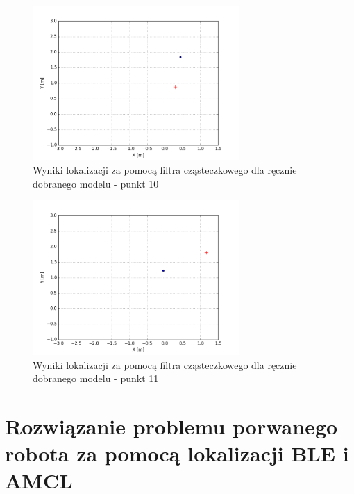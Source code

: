 \begin{figure}[H]
\centering
\includegraphics[width=0.7\textwidth]{img/pf-map3-10.png}
\caption{Wyniki lokalizacji za pomocą filtra cząsteczkowego dla ręcznie dobranego modelu - punkt 10}
\end{figure}
\begin{figure}[H]
\centering
\includegraphics[width=0.7\textwidth]{img/pf-map3-11.png}
\caption{Wyniki lokalizacji za pomocą filtra cząsteczkowego dla ręcznie dobranego modelu - punkt 11}
\label{fig:pf-last}
\end{figure}

\section{Rozwiązanie problemu porwanego robota za pomocą lokalizacji BLE i AMCL}

